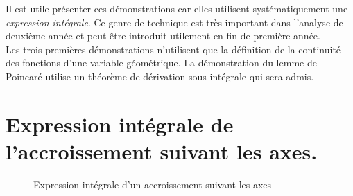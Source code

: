 

Il est utile présenter ces démonstrations car elles utilisent systématiquement une \emph{expression intégrale}. Ce genre de technique est très important dans l'analyse de deuxième année et peut être introduit utilement en fin de première année.\\
Les trois premières démonstrations n'utilisent que la définition de la continuité des fonctions d'une variable géométrique. La démonstration du lemme de Poincaré utilise un théorème de dérivation sous intégrale qui sera admis.
\section{Expression intégrale de l'accroissement suivant les axes.}
\begin{figure}[ht]
 \centering
 
 \caption{Expression intégrale d'un accroissement suivant les axes}
 \label{fig:C6308_0}
\end{figure}

